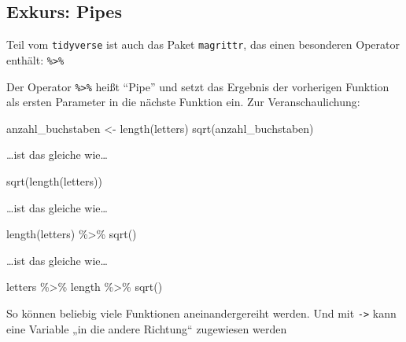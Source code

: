 \documentclass[11pt,german,a4paper]{article}
\newenvironment{Shaded}{\begin{snugshade}}{\end{snugshade}}
\newcommand{\FunctionTok}[1]{\textcolor[rgb]{0.00,0.00,0.00}{#1}}
\newcommand{\NormalTok}[1]{#1}
\newcommand{\OtherTok}[1]{\textcolor[rgb]{0.56,0.35,0.01}{#1}}
\newcommand{\SpecialCharTok}[1]{\textcolor[rgb]{0.00,0.00,0.00}{#1}}
\begin{document}
\hypertarget{exkurs-pipes}{%
\subsection{Exkurs: Pipes}\label{exkurs-pipes}}

Teil vom \texttt{tidyverse} ist auch das Paket \texttt{magrittr}, das einen besonderen Operator enthält: \texttt{\%\textgreater{}\%}

Der Operator \texttt{\%\textgreater{}\%} heißt ``Pipe'' und setzt das Ergebnis der vorherigen Funktion als ersten Parameter in die nächste Funktion ein. Zur Veranschaulichung:

\begin{Shaded}
\begin{Highlighting}[]
\NormalTok{anzahl\_buchstaben }\OtherTok{\textless{}{-}} \FunctionTok{length}\NormalTok{(letters)}
\FunctionTok{sqrt}\NormalTok{(anzahl\_buchstaben)}
\end{Highlighting}
\end{Shaded}

\ldots ist das gleiche wie\ldots{}

\begin{Shaded}
\begin{Highlighting}[]
\FunctionTok{sqrt}\NormalTok{(}\FunctionTok{length}\NormalTok{(letters))}
\end{Highlighting}
\end{Shaded}

\ldots ist das gleiche wie\ldots{}

\begin{Shaded}
\begin{Highlighting}[]
\FunctionTok{length}\NormalTok{(letters) }\SpecialCharTok{\%\textgreater{}\%}
  \FunctionTok{sqrt}\NormalTok{()}
\end{Highlighting}
\end{Shaded}

\ldots ist das gleiche wie\ldots{}

\begin{Shaded}
\begin{Highlighting}[]
\NormalTok{letters }\SpecialCharTok{\%\textgreater{}\%}
\NormalTok{  length }\SpecialCharTok{\%\textgreater{}\%}
  \FunctionTok{sqrt}\NormalTok{()}
\end{Highlighting}
\end{Shaded}

So können beliebig viele Funktionen aneinandergereiht werden. Und mit \texttt{-\textgreater{}} kann eine Variable „in die andere Richtung`` zugewiesen werden
\end{document}
